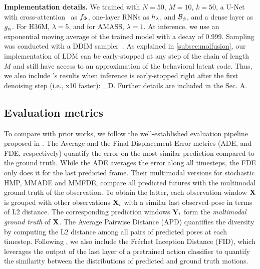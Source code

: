 \documentclass[10pt,twocolumn,letterpaper]{article}
\begin{document}
\textbf{Implementation details.} We trained \modelname{} with $N{=}50$, $M{=}10$, $k{=}50$, a U-Net with cross-attention~\cite{dhariwal2021diffusionbeatsgans} as $f_{\Phi}$, one-layer RNNs as $h_{\lambda}$, and $\mathcal{B}_{\phi}$, and a dense layer as $g_{\alpha}$. 
For H36M, $\lambda{=}5$, and for AMASS, $\lambda{=}1$. At inference, we use an exponential moving average of the trained model with a decay of 0.999. Sampling was conducted with a DDIM sampler~\cite{song2021ddim}.
As explained in \autoref{subsec:molfusion}, our implementation of LDM can be early-stopped at any step of the chain of length $M$ and still have access to an approximation of the behavioral latent code.
Thus, we also include \modelname{}'s results when inference is early-stopped right after the first denoising step (i.e., x10 faster): \modelname{}\_D. Further details are included in the \supp{} Sec. A.








\subsection{Evaluation metrics}
\label{subsec:evaluation_metrics} 

To compare \modelname{} with prior works, we follow the well-established evaluation pipeline proposed in \cite{yuan2020dlow}. The Average and the Final Displacement Error metrics (ADE, and FDE, respectively) quantify the error on the most similar prediction compared to the ground truth. While the ADE averages the error along all timesteps, the FDE only does it for the last predicted frame. Their multimodal versions for stochastic HMP, MMADE and MMFDE, compare all predicted futures with the multimodal ground truth of the observation. To obtain the latter, each observation window $\mathbf{X}$ is grouped with other observations $\mathbf{X}_i$ with a similar last observed pose in terms of L2 distance. The corresponding prediction windows $\mathbf{Y}_i$ form the \textit{multimodal ground truth} of $\mathbf{X}$.
The Average Pairwise Distance (APD) quantifies the diversity by computing the L2 distance among all pairs of predicted poses at each timestep. Following \cite{guo2020action2motion, petrovich2021action, dang2022diverse, bie2022hitdvae}, we also include the Fréchet Inception Distance (FID), which leverages the output of the last layer of a pretrained action classifier to quantify the similarity between the distributions of predicted and ground truth motions.
\end{document}
